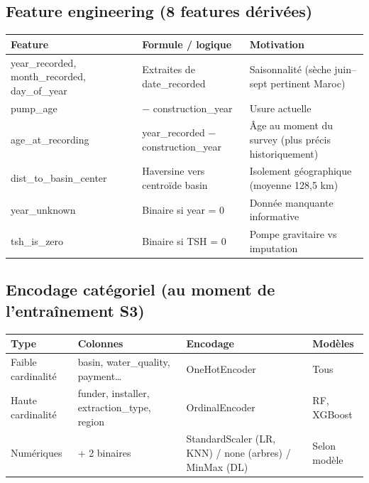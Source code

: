 \documentclass[11pt,a4paper]{report}
\begin{document}
\subsection{Feature engineering (8 features dérivées)}

{\small
\begin{longtable}{@{}>{\raggedright\arraybackslash}p{}>{\raggedright\arraybackslash}p{}>{\raggedright\arraybackslash}p{}@{}}
\toprule
\rowcolor{EHTPTableHead}Feature & Formule / logique & Motivation \\
\midrule
year\_recorded, month\_recorded, day\_of\_year & Extraites de date\_recorded & Saisonnalité (sèche juin–sept pertinent Maroc) \\
pump\_age & 2024 − construction\_year & Usure actuelle \\
age\_at\_recording & year\_recorded − construction\_year & Âge au moment du survey (plus précis historiquement) \\
dist\_to\_basin\_center & Haversine vers centroïde basin & Isolement géographique (moyenne 128,5 km) \\
year\_unknown & Binaire si year = 0 & Donnée manquante informative \\
tsh\_is\_zero & Binaire si TSH = 0 & Pompe gravitaire vs imputation \\
\bottomrule
\end{longtable}
}

\subsection{Encodage catégoriel (au moment de l'entraînement S3)}

{\small
\begin{longtable}{@{}>{\raggedright\arraybackslash}p{}>{\raggedright\arraybackslash}p{}>{\raggedright\arraybackslash}p{}>{\raggedright\arraybackslash}p{}@{}}
\toprule
\rowcolor{EHTPTableHead}Type & Colonnes & Encodage & Modèles \\
\midrule
Faible cardinalité & basin, water\_quality, payment… & OneHotEncoder & Tous \\
Haute cardinalité & funder, installer, extraction\_type, region & OrdinalEncoder & RF, XGBoost \\
Numériques & 15 + 2 binaires & StandardScaler (LR, KNN) / none (arbres) / MinMax (DL) & Selon modèle \\
\bottomrule
\end{longtable}
}
\end{document}
